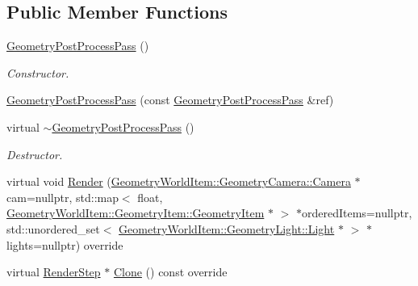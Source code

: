 \subsection*{Public Member Functions}
\begin{DoxyCompactItemize}
\item 
\mbox{\label{class_geometry_engine_1_1_geometry_render_step_1_1_geometry_post_process_pass_adc0f716913dee80f74646c811a7170b0}} 
\mbox{\hyperlink{class_geometry_engine_1_1_geometry_render_step_1_1_geometry_post_process_pass_adc0f716913dee80f74646c811a7170b0}{Geometry\+Post\+Process\+Pass}} ()
\begin{DoxyCompactList}\small\item\em Constructor. \end{DoxyCompactList}\item 
\mbox{\hyperlink{class_geometry_engine_1_1_geometry_render_step_1_1_geometry_post_process_pass_ae24ec0dbcc8082d4d45d1b1a09993fd2}{Geometry\+Post\+Process\+Pass}} (const \mbox{\hyperlink{class_geometry_engine_1_1_geometry_render_step_1_1_geometry_post_process_pass}{Geometry\+Post\+Process\+Pass}} \&ref)
\item 
\mbox{\label{class_geometry_engine_1_1_geometry_render_step_1_1_geometry_post_process_pass_ac3da0ba4cb7233e2c61f2cb762d05dea}} 
virtual \mbox{\hyperlink{class_geometry_engine_1_1_geometry_render_step_1_1_geometry_post_process_pass_ac3da0ba4cb7233e2c61f2cb762d05dea}{$\sim$\+Geometry\+Post\+Process\+Pass}} ()
\begin{DoxyCompactList}\small\item\em Destructor. \end{DoxyCompactList}\item 
virtual void \mbox{\hyperlink{class_geometry_engine_1_1_geometry_render_step_1_1_geometry_post_process_pass_ae359def8e0ef34a78454307b078352b6}{Render}} (\mbox{\hyperlink{class_geometry_engine_1_1_geometry_world_item_1_1_geometry_camera_1_1_camera}{Geometry\+World\+Item\+::\+Geometry\+Camera\+::\+Camera}} $\ast$cam=nullptr, std\+::map$<$ float, \mbox{\hyperlink{class_geometry_engine_1_1_geometry_world_item_1_1_geometry_item_1_1_geometry_item}{Geometry\+World\+Item\+::\+Geometry\+Item\+::\+Geometry\+Item}} $\ast$ $>$ $\ast$ordered\+Items=nullptr, std\+::unordered\+\_\+set$<$ \mbox{\hyperlink{class_geometry_engine_1_1_geometry_world_item_1_1_geometry_light_1_1_light}{Geometry\+World\+Item\+::\+Geometry\+Light\+::\+Light}} $\ast$ $>$ $\ast$lights=nullptr) override
\item 
virtual \mbox{\hyperlink{class_geometry_engine_1_1_geometry_render_step_1_1_render_step}{Render\+Step}} $\ast$ \mbox{\hyperlink{class_geometry_engine_1_1_geometry_render_step_1_1_geometry_post_process_pass_ab9eab79bba7251936921032596be21fe}{Clone}} () const override
\end{DoxyCompactItemize}
